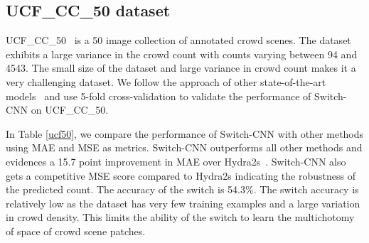 \documentclass[10pt,twocolumn,letterpaper]{article}
\begin{document}
\subsection{UCF\_CC\_50 dataset}

UCF\_CC\_50~\cite{idrees2013multi} is a 50 image collection of annotated crowd scenes. The dataset exhibits a large variance in the crowd count  with counts varying between
94 and 4543. The small size of the dataset and large variance in crowd count makes it a very challenging dataset. We follow the approach of other state-of-the-art models~\cite{zhang2015cross,boominathan2016crowdnet,onoro2016towards,zhang2016single} and use 5-fold cross-validation to validate the performance of Switch-CNN on UCF\_CC\_50.  

In Table \ref{ucf50}, we compare the performance of Switch-CNN with other methods using MAE and MSE as metrics. Switch-CNN outperforms all other methods and evidences a 15.7 point improvement in MAE over Hydra2s~\cite{onoro2016towards}. Switch-CNN also gets a competitive MSE score compared to Hydra2s indicating the robustness of the predicted count. The accuracy of the switch  is 54.3\%. The switch accuracy is relatively low as the dataset has very few training examples and a large variation in crowd density. This limits the ability of the switch to learn the multichotomy of space of crowd scene patches.


\begin{table}[!h]
\centering
{}

\vspace*{1.2mm}
\caption{Comparison of Switch-CNN with other state-of-the-art crowd counting methods on UCF\_CC\_50 dataset~\cite{idrees2013multi}.}
\label{ucf50}
\end{table}
\end{document}
